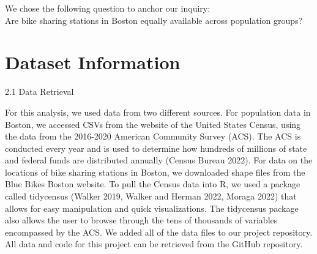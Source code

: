 \documentclass[
  12pt,
]{article}
\begin{document}
We chose the following question to anchor our inquiry:\\
Are bike sharing stations in Boston equally available across population
groups?

\newpage

\hypertarget{dataset-information}{%
\section{Dataset Information}\label{dataset-information}}

2.1 Data Retrieval

For this analysis, we used data from two different sources. For
population data in Boston, we accessed CSVs from the website of the
United States Census, using the data from the 2016-2020 American
Community Survey (ACS). The ACS is conducted every year and is used to
determine how hundreds of millions of state and federal funds are
distributed annually (Census Bureau 2022). For data on the locations of
bike sharing stations in Boston, we downloaded shape files from the Blue
Bikes Boston website. To pull the Census data into R, we used a package
called tidycensus (Walker 2019, Walker and Herman 2022, Moraga 2022)
that allows for easy manipulation and quick visualizations. The
tidycensus package also allows the user to browse through the tens of
thousands of variables encompassed by the ACS. We added all of the data
files to our project repository. All data and code for this project can
be retrieved from the GitHub repository.
\end{document}

